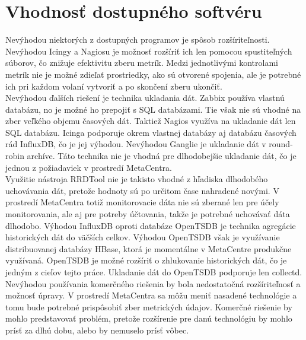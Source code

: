 \documentclass[printed,11pt,twoside,color,cover,table]{fithesis3}
\begin{document}
\section{Vhodnosť dostupného softvéru}
Nevýhodou niektorých z dostupných programov je spôsob rozšíriteľnosti. Nevýhodou Icingy a Nagiosu je možnosť rozšíriť ich len pomocou spustiteľných súborov, čo znižuje efektivitu zberu metrík.
Medzi jednotlivými kontrolami metrík nie je možné zdieľať prostriedky, ako sú otvorené spojenia, ale je potrebné ich pri každom volaní vytvoriť a po skončení zberu ukončiť.
\\Nevýhodou ďalších riešení je technika ukladania dát. Zabbix používa vlastnú databázu, no je možné ho prepojiť s SQL databázami. Tie však nie sú vhodné na zber veľkého objemu časových dát. Taktiež Nagios
využíva na ukladanie dát len SQL databázu. Icinga podporuje okrem vlastnej databázy aj databázu časových rád InfluxDB, čo je jej výhodou. Nevýhodou Ganglie je ukladanie dát v round-robin archíve. Táto technika
nie je vhodná pre dlhodobejšie ukladanie dát, čo je jednou z požiadaviek v prostredí MetaCentra.
\\Využitie nástroja RRDTool nie je takisto vhodné z hľadiska dlhodobého uchovávania dát, pretože hodnoty sú po určitom čase nahradené novými. V prostredí MetaCentra totiž monitorovacie dáta nie sú zberané len 
pre účely monitorovania, ale aj pre potreby účtovania, takže je potrebné uchovávať dáta dlhodobo.
Výhodou InfluxDB oproti databáze OpenTSDB je technika agregácie historických dát do väčších celkov. Výhodou OpenTSDB však je využívanie distribuovanej
databázy HBase, ktorá je momentálne v MetaCentre produkčne využívaná. OpenTSDB je možné rozšíriť o zhlukovanie historických dát, čo je jedným z cieľov tejto práce. Ukladanie dát do OpenTSDB podporuje len collectd.
\\Nevýhodou používania komerčného riešenia by bola nedostatočná rozšíriteľnosť a možnosť úpravy. V prostredí MetaCentra sa môžu meniť nasadené technológie a tomu bude potrebné prispôsobiť zber 
metrických údajov. Komerčné riešenie by mohlo predstavovať problém, pretože rozšírenie pre danú technológiu by mohlo prísť za dlhú dobu, alebo by nemuselo prísť vôbec.
\end{document}
